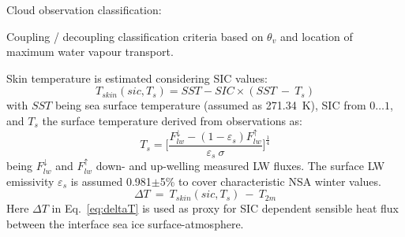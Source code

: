 \documentclass[portrate,paperwidth=841mm,paperheight=1189mm,fontscale=0.4,margin=1cm]{baposter}
\begin{document}
\begin{poster}
{\colouredcircle Cloud observation classification:\\
\begin{minipage}{0.9\textwidth}
	\centering
	\caption{\small Coupling / decoupling classification criteria based on $\theta_v$ and location of maximum water vapour transport.}
	\label{fig:cop-dec}
\end{minipage}


\colouredcircle Skin temperature is estimated considering SIC values:
\begin{equation}
	T_{skin}(sic, T_s) = SST - SIC\times(SST~-~T_s)
	\label{eq:Tskin}
\end{equation}
with $SST$ being sea surface temperature (assumed as 271.34~K), SIC from $0\dots1$, and $T_s$ the surface temperature derived from observations as:
\[
	T_s = \Big[ \frac{F_{lw}^{\downarrow} - (1-\varepsilon_s)F_{lw}^{\uparrow}}{\varepsilon_s~\sigma} \Big]^{\frac{1}{4}}
\]
being $F_{lw}^{\downarrow}$ and $F_{lw}^{\uparrow}$ down- and up-welling measured LW fluxes. The surface LW emissivity $\varepsilon_s$ is assumed 0.981$\pm$5\% to cover characteristic NSA winter values.
\begin{equation}
	\Delta T~=~T_{skin}(sic, T_s)~-~T_{2m}
	\label{eq:deltaT}
\end{equation}
Here $\Delta T$ in Eq.~\ref{eq:deltaT} is used as proxy for SIC dependent sensible heat flux between the interface sea ice surface-atmosphere. %

} %


\end{poster}
\end{document}
